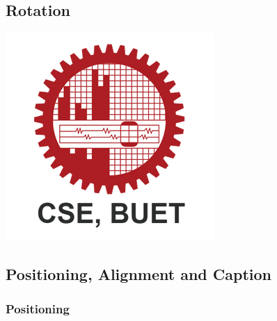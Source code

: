 \documentclass{article}
\begin{document}
\pagebreak

\subsection{Rotation}
\includegraphics[scale=.5,angle=45]{Images/CSE_BUET.png}

\pagebreak

\subsection{Positioning, Alignment and Caption }

\subsubsection{Positioning}
\end{document}
